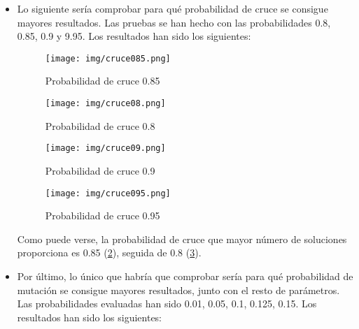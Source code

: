 \documentclass[a4,11pt]{article}
\begin{document}
\begin{itemize}
\begin{figure}[h]
\begin{center}
\texttt{[image: img/pon150.png]}
\end{center}
\caption{Población de 150 individuos}
\label{fig:pob150}
\end{figure}

En esta ocasión se puede comprobar que existe un mayor número de soluciones para tamaños de población 150 (\ref{fig:pob150}), por lo que sería nuestra elección de cara a dar los parámetros más aptos.

\item Lo siguiente sería comprobar para qué probabilidad de cruce se consigue mayores resultados. Las pruebas se han hecho con las probabilidades 0.8, 0.85, 0.9 y 9.95. Los resultados han sido los siguientes:


\begin{figure}[t!]
\begin{center}
\texttt{[image: img/cruce085.png]}
\end{center}
\caption{Probabilidad de cruce 0.85}
\label{fig:cruce085}
\end{figure}

\begin{figure}[t!]
\begin{center}
\texttt{[image: img/cruce08.png]}
\end{center}
\caption{Probabilidad de cruce 0.8}
\label{fig:cruce08}
\end{figure}

\begin{figure}[t!]
\begin{center}
\texttt{[image: img/cruce09.png]}
\end{center}
\caption{Probabilidad de cruce 0.9}
\label{fig:cruce09}
\end{figure}

\begin{figure}[t!]
\begin{center}
\texttt{[image: img/cruce095.png]}
\end{center}
\caption{Probabilidad de cruce 0.95}
\label{fig:cruce095}
\end{figure}

Como puede verse, la probabilidad de cruce que mayor número de soluciones proporciona es 0.85 (\ref{fig:cruce085}), seguida de 0.8 (\ref{fig:cruce08}).

\item Por último, lo único que habría que comprobar sería para qué probabilidad de mutación se consigue mayores resultados, junto con el resto de parámetros. Las probabilidades evaluadas han sido 0.01, 0.05, 0.1, 0.125, 0.15. Los resultados han sido los siguientes:


\end{itemize}
\end{document}
